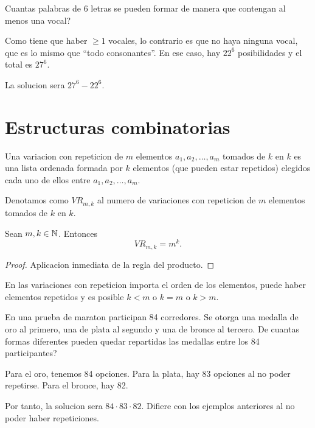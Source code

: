 \begin{example}
	Cuantas palabras de 6 letras se pueden formar de manera que contengan al menos una vocal?
	
	Como tiene que haber \(\geq  1 \) vocales, lo contrario es que no haya ninguna vocal, que es lo mismo que ``todo consonantes''. En ese caso, hay \(22^{6}\) posibilidades y el total es \(27^{6} \).
	
	La solucion sera \(27^{6} - 22^{6} \).
\end{example}

\section{Estructuras combinatorias}
\begin{definition}
	Una variacion con repeticion de \(m \) elementos \(a_1, a_2, \ldots, a_{m }\) tomados de \(k \) en \(k \) es una lista ordenada formada por \(k \) elementos (que pueden estar repetidos) elegidos cada uno de ellos entre \(a_1, a_2, \ldots, a_m \).
	
	Denotamos como \(VR_{m,k}\) al numero de variaciones con repeticion de \(m \) elementos tomados de \(k \) en \(k \).
\end{definition}

\vspace{2cm}
\begin{theorem}
	Sean \(m,k \in \mathbb{N} \). Entonces
	\[
		VR_{m,k} = m^{k}.
	\]
\end{theorem}
\begin{proof}
	Aplicacion inmediata de la regla del producto.
\end{proof}

En las variaciones con repeticion importa el orden de los elementos, puede haber elementos repetidos y es posible \(k < m \) o \(k = m \) o \(k > m \).

\begin{example}
	En una prueba de maraton participan 84 corredores. Se otorga una medalla de oro al primero, una de plata al segundo y una de bronce al tercero. De cuantas formas diferentes pueden quedar repartidas las medallas entre los 84 participantes?
	
	Para el oro, tenemos 84 opciones. Para la plata, hay 83 opciones al no poder repetirse. Para el bronce, hay 82.
	
	Por tanto, la solucion sera \(84 \cdot 83 \cdot 82 \). Difiere con los ejemplos anteriores al no poder haber repeticiones.
\end{example}

